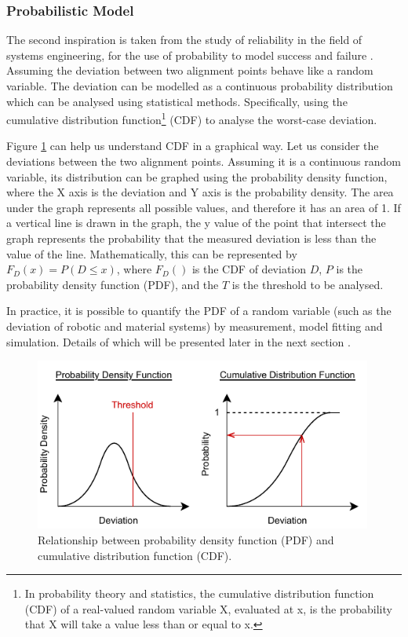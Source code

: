 \subsubsection{Probabilistic Model}
\label{subsubsection:probabilistic-model}

The second inspiration is taken from the study of reliability in the field of systems engineering, for the use of probability to model success and failure \parencite{hallmannToleranceAllocationTolerancecost2020}. Assuming the deviation between two alignment points behave like a random variable. The deviation can be modelled as a continuous probability distribution which can be analysed using statistical methods. Specifically, using the cumulative distribution function\footnote{ In probability theory and statistics, the cumulative distribution function (CDF) of a real-valued random variable X, evaluated at x, is the probability that X will take a value less than or equal to x. } (CDF) to analyse the worst-case deviation.

Figure \ref{fig:pdf-and-cdf} can help us understand CDF in a graphical way. Let us consider the deviations between the two alignment points. Assuming it is a continuous random variable, its distribution can be graphed using the probability density function, where the X axis is the deviation and Y axis is the probability density. The area under the graph represents all possible values, and therefore it has an area of 1. If a vertical line is drawn in the graph, the y value of the point that intersect the graph represents the probability that the measured deviation is less than the value of the line. Mathematically, this can be represented by $F_D (x) = P (D \leq x)$, where $F_D ()$ is the CDF of deviation $D$, $P$ is the probability density function (PDF), and the $T$ is the threshold to be analysed.

In practice, it is possible to quantify the PDF of a random variable (such as the deviation of robotic and material systems) by measurement, model fitting and simulation. Details of which will be presented later in the next section .

\begin{figure}[ht]
    \centering
    \includegraphics[width=0.99\textwidth]{images/09/Density Function.pdf}
    \caption{Relationship between probability density function (PDF) and cumulative distribution function (CDF).}
    \label{fig:pdf-and-cdf}
\end{figure}


